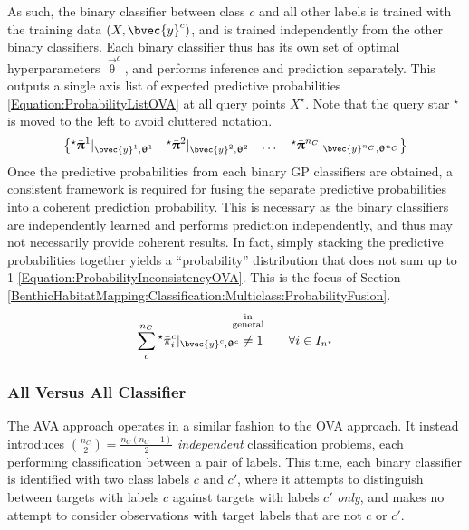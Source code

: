 				As such, the binary classifier between class $c$ and all other labels is trained with the training data $(X, \bvec{y}^{c})$, and is trained independently from the other binary classifiers. Each binary classifier thus has its own set of optimal hyperparameters $\vec{\uptheta}^{c}$, and performs inference and prediction separately. This outputs a single axis list of expected predictive probabilities \eqref{Equation:ProbabilityListOVA} at all query points $X^{\star}$. Note that the query star $^{\star}$ is moved to the left to avoid cluttered notation. \begin{equation}
					\begin{Bmatrix*}
						{^{\star}}\bar{\vec{\uppi}}^{1} |_{\bvec{y}^{1}, \vec{\uptheta}^{1}} & {^{\star}}\bar{\vec{\uppi}}^{2} |_{\bvec{y}^{2}, \vec{\uptheta}^{2}} & \dots & {^{\star}}\bar{\vec{\uppi}}^{n_{C}} |_{\bvec{y}^{n_{C}}, \vec{\uptheta}^{n_{C}}}
					\end{Bmatrix*} 
				\label{Equation:ProbabilityListOVA}
				\end{equation} Once the predictive probabilities from each binary GP classifiers are obtained, a consistent framework is required for fusing the separate predictive probabilities into a coherent prediction probability. This is necessary as the binary classifiers are independently learned and performs prediction independently, and thus may not necessarily provide coherent results. In fact, simply stacking the predictive probabilities together yields a ``probability'' distribution that does not sum up to 1 \eqref{Equation:ProbabilityInconsistencyOVA}. This is the focus of Section \ref{BenthicHabitatMapping:Classification:Multiclass:ProbabilityFusion}. \begin{equation}
					\sum_{c}^{n_{C}} {^{\star}}\bar{\pi}^{c}_{i} |_{\bvec{y}^{c}, \vec{\uptheta}^{c}} \stackrel{\mathclap{\substack{\text{in} \\ \text{general} \\ \quad }}}{\neq} 1 \qquad \forall i \in I_{n^{\star}}
				\label{Equation:ProbabilityInconsistencyOVA}
				\end{equation}
				
			\subsubsection{All Versus All Classifier}
			\label{BenthicHabitatMapping:Classification:MulticlassClassification:AVA}
			
				The AVA approach operates in a similar fashion to the OVA approach. It instead introduces ${n_{C} \choose 2} = \frac{n_{C} (n_{C} - 1)}{2}$ \textit{independent} classification problems, each performing classification between a pair of labels. This time, each binary classifier is identified with two class labels $c$ and $c'$, where it attempts to distinguish between targets with labels $c$ against targets with labels $c'$ \textit{only}, and makes no attempt to consider observations with target labels that are not $c$ or $c'$. 
				
